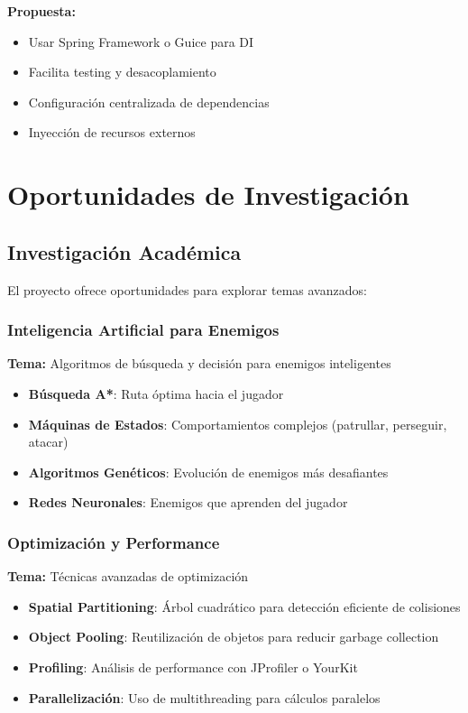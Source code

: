 \documentclass[12pt, a4paper]{article}
\begin{document}
\textbf{Propuesta:}
\begin{itemize}[leftmargin=2em]
    \item Usar Spring Framework o Guice para DI
    \item Facilita testing y desacoplamiento
    \item Configuración centralizada de dependencias
    \item Inyección de recursos externos
\end{itemize}

\section{Oportunidades de Investigación}

\subsection{Investigación Académica}

El proyecto ofrece oportunidades para explorar temas avanzados:

\subsubsection{Inteligencia Artificial para Enemigos}

\textbf{Tema:} Algoritmos de búsqueda y decisión para enemigos inteligentes

\begin{itemize}[leftmargin=2em]
    \item \textbf{Búsqueda A*}: Ruta óptima hacia el jugador
    \item \textbf{Máquinas de Estados}: Comportamientos complejos (patrullar, perseguir, atacar)
    \item \textbf{Algoritmos Genéticos}: Evolución de enemigos más desafiantes
    \item \textbf{Redes Neuronales}: Enemigos que aprenden del jugador
\end{itemize}

\subsubsection{Optimización y Performance}

\textbf{Tema:} Técnicas avanzadas de optimización

\begin{itemize}[leftmargin=2em]
    \item \textbf{Spatial Partitioning}: Árbol cuadrático para detección eficiente de colisiones
    \item \textbf{Object Pooling}: Reutilización de objetos para reducir garbage collection
    \item \textbf{Profiling}: Análisis de performance con JProfiler o YourKit
    \item \textbf{Parallelización}: Uso de multithreading para cálculos paralelos
\end{itemize}
\end{document}
